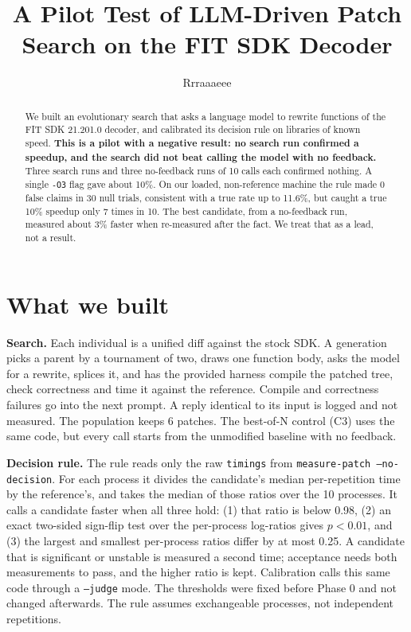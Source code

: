 \documentclass[10pt,twocolumn]{article}
\title{A Pilot Test of LLM-Driven Patch Search on the FIT SDK Decoder}
\author{Rrraaaeee}
\date{}
\begin{document}
\maketitle

\begin{abstract}
We built an evolutionary search that asks a language model to rewrite functions of
the FIT SDK 21.201.0 decoder, and calibrated its decision rule on libraries of known
speed. \textbf{This is a pilot with a negative result: no search run confirmed a
speedup, and the search did not beat calling the model with no feedback.} Three
search runs and three no-feedback runs of 10 calls each confirmed nothing. A single
\texttt{-O3} flag gave about 10\%. On our loaded, non-reference machine the rule
made 0 false claims in 30 null trials, consistent with a true rate up to 11.6\%, but
caught a true 10\% speedup only 7 times in 10. The best candidate, from a
no-feedback run, measured about 3\% faster when re-measured after the fact. We treat
that as a lead, not a result.
\end{abstract}

\section{What we built}
\textbf{Search.} Each individual is a unified diff against the stock SDK. A
generation picks a parent by a tournament of two, draws one function body, asks the
model for a rewrite, splices it, and has the provided harness compile the patched
tree, check correctness and time it against the reference. Compile and correctness
failures go into the next prompt. A reply identical to its input is logged and not
measured. The population keeps 6 patches. The best-of-N control (C3) uses the same
code, but every call starts from the unmodified baseline with no feedback.

\textbf{Decision rule.} The rule reads only the raw \texttt{timings} from
\texttt{measure-patch --no-decision}. For each process it divides the candidate's
median per-repetition time by the reference's, and takes the median of those ratios
over the 10 processes. It calls a candidate faster when all three hold: (1) that
ratio is below 0.98, (2) an exact two-sided sign-flip test over the per-process
log-ratios gives $p<0.01$, and (3) the largest and smallest per-process ratios
differ by at most 0.25. A candidate that is significant or unstable is measured a
second time; acceptance needs both measurements to pass, and the higher ratio is
kept. Calibration calls this same code through a \texttt{--judge} mode. The
thresholds were fixed before Phase 0 and not changed afterwards. The rule assumes
exchangeable processes, not independent repetitions.
\end{document}
